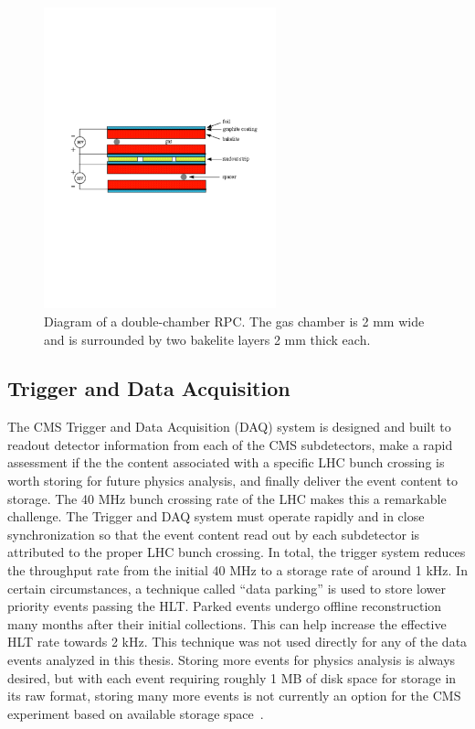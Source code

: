 \begin{figure}[htbp]
\centering
     \includegraphics[width=0.6\textwidth]{cms_and_lhc/plots/cms_muon_rpc.pdf}
     \caption{
Diagram of a double-chamber RPC. The gas chamber is 2 mm wide and is surrounded by two
bakelite layers 2 mm thick each.
     }
     \label{fig:cms_muon_rpc}
\end{figure}



\subsection{Trigger and Data Acquisition}
The CMS Trigger and Data Acquisition (DAQ) system is designed and built to readout detector
information from each of the CMS subdetectors, make a rapid assessment if the the content
associated with a specific LHC bunch crossing is worth storing for future physics analysis,
and finally deliver the event content to storage. The 40 MHz bunch crossing rate of
the LHC makes this a remarkable challenge. The Trigger and DAQ system must operate rapidly
and in close synchronization so that the event content read out by each subdetector is attributed
to the proper LHC bunch crossing. In total, the trigger system reduces the throughput rate from the
initial 40 MHz to a storage rate of around 1 kHz. In certain circumstances, a technique called
``data parking'' is used to store lower priority events passing the HLT. Parked events undergo
offline reconstruction many months after their initial collections. This can help increase the
effective HLT rate towards 2 kHz. This technique was not used directly for any of the data events
analyzed in this thesis. Storing more events for physics analysis is
always desired, but with each event requiring roughly 1 MB of disk space for storage in its
raw format, storing many more events is not currently an option for the CMS experiment based 
on available storage space~\cite{CMS-Proposal}. 



